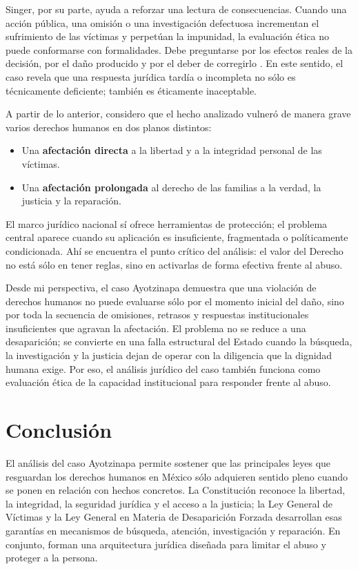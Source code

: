 \documentclass[
	spanish,
	letterpaper, oneside
]{article}
\begin{document}
Singer, por su parte, ayuda a reforzar una lectura de consecuencias. Cuando una acción pública, una omisión o una investigación defectuosa incrementan el sufrimiento de las víctimas y perpetúan la impunidad, la evaluación ética no puede conformarse con formalidades. Debe preguntarse por los efectos reales de la decisión, por el daño producido y por el deber de corregirlo \citep{singerCompendioEtica1995}. En este sentido, el caso revela que una respuesta jurídica tardía o incompleta no sólo es técnicamente deficiente; también es éticamente inaceptable.

A partir de lo anterior, considero que el hecho analizado vulneró de manera grave varios derechos humanos en dos planos distintos:

\begin{itemize}
  \item Una \textbf{afectación directa} a la libertad y a la integridad personal de las víctimas.
  \item Una \textbf{afectación prolongada} al derecho de las familias a la verdad, la justicia y la reparación.
\end{itemize}

El marco jurídico nacional sí ofrece herramientas de protección; el problema central aparece cuando su aplicación es insuficiente, fragmentada o políticamente condicionada. Ahí se encuentra el punto crítico del análisis: el valor del Derecho no está sólo en tener reglas, sino en activarlas de forma efectiva frente al abuso.

Desde mi perspectiva, el caso Ayotzinapa demuestra que una violación de derechos humanos no puede evaluarse sólo por el momento inicial del daño, sino por toda la secuencia de omisiones, retrasos y respuestas institucionales insuficientes que agravan la afectación. El problema no se reduce a una desaparición; se convierte en una falla estructural del Estado cuando la búsqueda, la investigación y la justicia dejan de operar con la diligencia que la dignidad humana exige. Por eso, el análisis jurídico del caso también funciona como evaluación ética de la capacidad institucional para responder frente al abuso.

\section{Conclusión}

El análisis del caso Ayotzinapa permite sostener que las principales leyes que resguardan los derechos humanos en México sólo adquieren sentido pleno cuando se ponen en relación con hechos concretos. La Constitución reconoce la libertad, la integridad, la seguridad jurídica y el acceso a la justicia; la Ley General de Víctimas y la Ley General en Materia de Desaparición Forzada desarrollan esas garantías en mecanismos de búsqueda, atención, investigación y reparación. En conjunto, forman una arquitectura jurídica diseñada para limitar el abuso y proteger a la persona.
\end{document}
